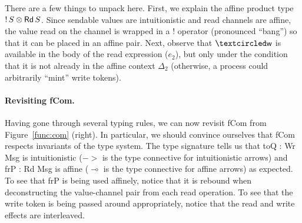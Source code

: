 There are a few things to unpack here. First, we explain the affine product type
${{!}\,{S}}\otimes{{\textnormal{\textsf{Rd}}\,S}}$. Since sendable values are intuitionistic
and read channels are affine, the value read on the channel is wrapped in a $!$
operator (pronounced ``bang'') so that it can be placed in an affine pair. Next,
observe that $\wrtok$ is available in the body of the read expression ($e_2$),
but only under the condition that it is not already in the affine context $\Delta_2$
(otherwise, a process could arbitrarily ``mint'' write tokens).

\paragraph{Revisiting \textsf{fCom}.} Having gone through several typing rules, we can now revisit \textsf{fCom} from
Figure~\ref{func:com} (right). In particular, we should convince ourselves that
\textsf{fCom} respects invariants of the type system. The type signature tells
us that \textsf{toQ : Wr Msg} is intuitionistic ($->$ is the type connective for
intuitionistic arrows) and \textsf{frP : Rd Msg} is affine ($\multimap$ is the type
connective for affine arrows) as expected. To see that \textsf{frP} is being
used affinely, notice that it is rebound when deconstructing the value-channel
pair from each read operation. To see that the write token is being passed
around appropriately, notice that the read and write effects are interleaved.


